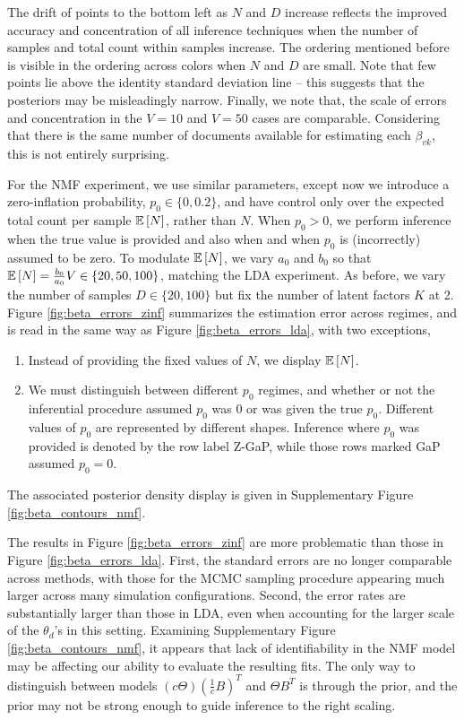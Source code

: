 \documentclass[oupdraft]{bio}
\begin{document}
The drift of points to the bottom left as $N$ and $D$ increase reflects the
improved accuracy and concentration of all inference techniques when the number
of samples and total count within samples increase. The ordering mentioned
before is visible in the ordering across colors when $N$ and $D$ are small. Note
that few points lie above the identity standard deviation line -- this suggests
that the posteriors may be misleadingly narrow. Finally, we note that, the scale
of errors and concentration in the $V = 10$ and $V = 50$ cases are comparable.
Considering that there is the same number of documents available for estimating
each $\beta_{vk}$, this is not entirely surprising.

For the NMF experiment, we use similar parameters, except now we introduce a
zero-inflation probability, $p_{0} \in \{0, 0.2\}$, and have control only over
the expected total count per sample $\mathbb{E}\left[{N}\right]$, rather than $N$. When $p_{0} >
0$, we perform inference when the true value is provided and also when and when
$p_{0}$ is (incorrectly) assumed to be zero. To modulate $\mathbb{E}\left[{N}\right]$, we vary
$a_{0}$ and $b_{0}$ so that $\mathbb{E}\left[{N}\right] = \frac{b_{0}}{a_{0}}V \in \{20, 50,
100\}$, matching the LDA experiment. As before, we vary the number of samples $D
\in \{20, 100\}$ but fix the number of latent factors $K$ at 2. Figure
\ref{fig:beta_errors_zinf} summarizes the estimation error across regimes, and
is read in the same way as Figure \ref{fig:beta_errors_lda}, with two
exceptions,
\begin{enumerate}
\item Instead of providing the fixed values of $N$, we display $\mathbb{E}\left[{N}\right]$.
\item We must distinguish between different $p_{0}$ regimes, and whether or not
  the inferential procedure assumed $p_{0}$ was 0 or was given the true $p_{0}$.
  Different values of $p_{0}$ are represented by different shapes. Inference
  where $p_{0}$ was provided is denoted by the row label Z-GaP, while those rows
  marked GaP assumed $p_{0} = 0$.
\end{enumerate}
The associated posterior density display is given in Supplementary Figure
\ref{fig:beta_contours_nmf}.

The results in Figure \ref{fig:beta_errors_zinf} are more problematic than those
in Figure \ref{fig:beta_errors_lda}. First, the standard errors are no longer
comparable across methods, with those for the MCMC sampling procedure appearing
much larger across many simulation configurations. Second, the error rates are
substantially larger than those in LDA, even when accounting for the larger
scale of the $\theta_{d}$'s in this setting. Examining Supplementary Figure
\ref{fig:beta_contours_nmf}, it appears that lack of identifiability in the NMF
model may be affecting our ability to evaluate the resulting fits. The only way
to distinguish between models $\left(c\Theta\right)\left(\frac{1}{c}
B\right)^{T}$ and $\Theta B^{T}$ is through the prior, and the prior may not be
strong enough to guide inference to the right scaling.
\end{document}
